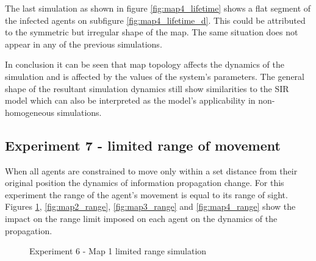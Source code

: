 The last simulation as shown in figure \ref{fig:map4_lifetime} shows a flat segment of the infected agents on subfigure \ref{fig:map4_lifetime_d}.
This could be attributed to the symmetric but irregular shape of the map.
The same situation does not appear in any of the previous simulations.

In conclusion it can be seen that map topology affects the dynamics of the simulation and is affected by the values of the system's parameters.
The general shape of the resultant simulation dynamics still show similarities to the SIR model which can also be interpreted as the model's applicability in non-homogeneous simulations.

\subsection{Experiment 7 - limited range of movement}

When all agents are constrained to move only within a set distance from their original position the dynamics of information propagation change.
For this experiment the range of the agent's movement is equal to its range of sight.
Figures \ref{fig:map1_range}, \ref{fig:map2_range}, \ref{fig:map3_range} and \ref{fig:map4_range} show the impact on the range limit imposed on each agent on the dynamics of the propagation.

\begin{figure}[H]
    \centering

    \hspace*{\fill}
    \hspace*{\fill}

    \caption{Experiment 6 - Map 1 limited range simulation}\label{fig:map1_range}
\end{figure}

